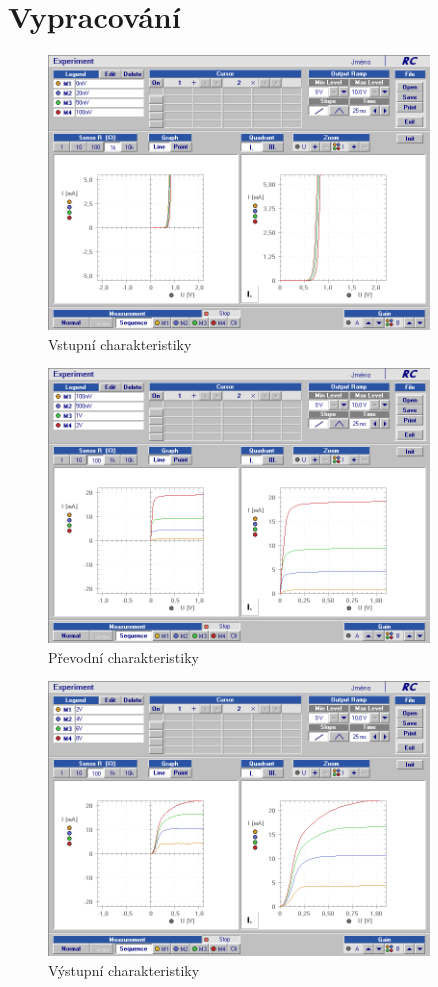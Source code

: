 \documentclass[a4paper]{article}
\begin{document}
\section*{Vypracování}
\begin{figure}[H]
	\centering
	\includegraphics[width=0.9\textwidth]{tranzistory1.png}
	\caption{Vstupní charakteristiky}
\end{figure}
\begin{figure}[H]
	\centering
	\includegraphics[width=0.9\textwidth]{tranzistory2.png}
	\caption{Převodní charakteristiky}
\end{figure}
\begin{figure}[H]
	\centering
	\includegraphics[width=0.9\textwidth]{tranzistory3.png}
	\caption{Výstupní charakteristiky}
\end{figure}
\end{document}
